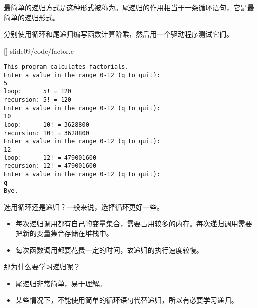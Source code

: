 \begin{frame}[fragile]
最简单的递归方式是这种形式被称为。尾递归的作用相当于一条循环语句，它是最简单的递归形式。
\end{frame}

\begin{frame}[fragile]
分别使用循环和尾递归编写函数计算阶乘，然后用一个驱动程序测试它们。
\end{frame}

\begin{frame}
  
  []
  {slide09/code/factor.c}
\end{frame}


\begin{frame}[fragile]
\begin{lstlisting}
This program calculates factorials.
Enter a value in the range 0-12 (q to quit):
5
loop:      5! = 120
recursion: 5! = 120
Enter a value in the range 0-12 (q to quit):
10
loop:      10! = 3628800
recursion: 10! = 3628800
Enter a value in the range 0-12 (q to quit):
12
loop:      12! = 479001600
recursion: 12! = 479001600
Enter a value in the range 0-12 (q to quit):
q
Bye.
\end{lstlisting}
\end{frame}

\begin{frame}[fragile]
{\Large 选用循环还是递归？}\pause 一般来说，选择循环更好一些。
\pause
\vspace{0.1in}

\begin{itemize}
\item 每次递归调用都有自己的变量集合，需要占用较多的内存。每次递归调用需要把新的变量集合存储在堆栈中。\\[0.1in]
\item 每次函数调用都要花费一定的时间，故递归的执行速度较慢。
\end{itemize}
\end{frame}

\begin{frame}[fragile]
{\Large 那为什么要学习递归呢？}\pause 
\vspace{0.1in}

\begin{itemize}
\item 尾递归非常简单，易于理解。\\[0.1in]
\item 某些情况下，不能使用简单的循环语句代替递归，所以有必要学习递归。
\end{itemize}

\end{frame}


